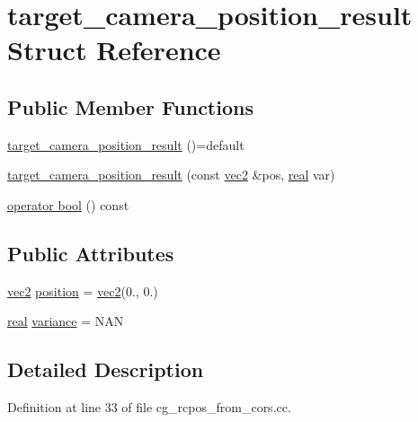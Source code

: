 \hypertarget{structtarget__camera__position__result}{}\section{target\+\_\+camera\+\_\+position\+\_\+result Struct Reference}
\label{structtarget__camera__position__result}
\subsection*{Public Member Functions}
\begin{DoxyCompactItemize}
\item 
\hyperlink{structtarget__camera__position__result_af3a7af786df9768f6c6eed9397255139}{target\+\_\+camera\+\_\+position\+\_\+result} ()=default
\item 
\hyperlink{structtarget__camera__position__result_a2bef2bba908a455f291d42e4a0e04378}{target\+\_\+camera\+\_\+position\+\_\+result} (const \hyperlink{namespacetlz_ae192989bfbe6c700ac84d2a8cf05ebb4}{vec2} \&pos, \hyperlink{namespacetlz_a15fd37cce97f2b8b606af18c2615f602}{real} var)
\item 
\hyperlink{structtarget__camera__position__result_a521a889c20871ab64c9fa053e436019f}{operator bool} () const 
\end{DoxyCompactItemize}
\subsection*{Public Attributes}
\begin{DoxyCompactItemize}
\item 
\hyperlink{namespacetlz_ae192989bfbe6c700ac84d2a8cf05ebb4}{vec2} \hyperlink{structtarget__camera__position__result_aa0097781d0b7c043fb89d697d7659238}{position} = \hyperlink{namespacetlz_ae192989bfbe6c700ac84d2a8cf05ebb4}{vec2}(0., 0.)
\item 
\hyperlink{namespacetlz_a15fd37cce97f2b8b606af18c2615f602}{real} \hyperlink{structtarget__camera__position__result_af17c7e224cdb90691847e995535c0d50}{variance} = N\+AN
\end{DoxyCompactItemize}


\subsection{Detailed Description}


Definition at line 33 of file cg\+\_\+rcpos\+\_\+from\+\_\+cors.\+cc.



